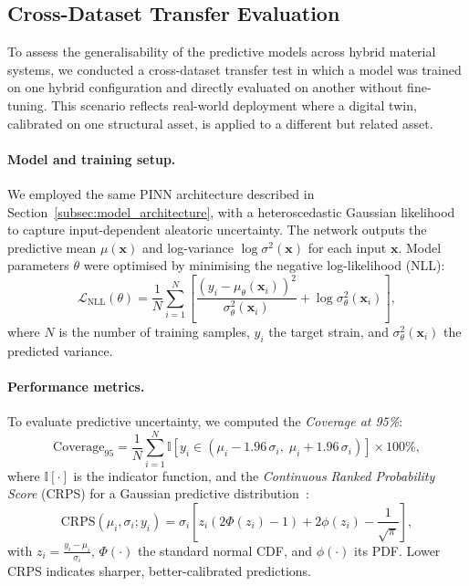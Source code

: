 \documentclass{article}
\begin{document}
\subsection{Cross-Dataset Transfer Evaluation}
\label{sec:cross_dataset}

To assess the generalisability of the predictive models across hybrid material systems, we conducted a cross-dataset transfer test in which a model was trained on one hybrid configuration and directly evaluated on another without fine-tuning. This scenario reflects real-world deployment where a digital twin, calibrated on one structural asset, is applied to a different but related asset.

\paragraph{Model and training setup.}
We employed the same PINN architecture described in Section~\ref{subsec:model_architecture}, with a heteroscedastic Gaussian likelihood to capture input-dependent aleatoric uncertainty. The network outputs the predictive mean $\mu(\mathbf{x})$ and log-variance $\log\sigma^2(\mathbf{x})$ for each input $\mathbf{x}$. Model parameters $\theta$ were optimised by minimising the negative log-likelihood (NLL):
\begin{equation}
    \mathcal{L}_{\mathrm{NLL}}(\theta) = 
    \frac{1}{N} \sum_{i=1}^N 
    \left[ \frac{\left( y_i - \mu_\theta(\mathbf{x}_i) \right)^2}{\sigma^2_\theta(\mathbf{x}_i)} 
    + \log\sigma^2_\theta(\mathbf{x}_i) \right],
    \label{eq:hetero_nll}
\end{equation}
where $N$ is the number of training samples, $y_i$ the target strain, and $\sigma^2_\theta(\mathbf{x}_i)$ the predicted variance.

\paragraph{Performance metrics.}
To evaluate predictive uncertainty, we computed the \emph{Coverage at 95\%}:
\begin{equation}
    \mathrm{Coverage}_{95} = 
    \frac{1}{N} \sum_{i=1}^N 
    \mathbb{I} \left[ y_i \in 
    \left( \mu_i - 1.96\,\sigma_i, \; \mu_i + 1.96\,\sigma_i \right) \right] \times 100\%,
    \label{eq:coverage}
\end{equation}
where $\mathbb{I}[\cdot]$ is the indicator function, and the \emph{Continuous Ranked Probability Score} (CRPS) for a Gaussian predictive distribution~\cite{Gneiting2007CRPS}:
\begin{equation}
    \mathrm{CRPS}(\mu_i,\sigma_i; y_i) =
    \sigma_i \left[ z_i \left( 2\Phi(z_i) - 1 \right) + 2\phi(z_i) - \frac{1}{\sqrt{\pi}} \right],
    \label{eq:crps}
\end{equation}
with $z_i = \frac{y_i - \mu_i}{\sigma_i}$, $\Phi(\cdot)$ the standard normal CDF, and $\phi(\cdot)$ its PDF. Lower CRPS indicates sharper, better-calibrated predictions.
\end{document}
